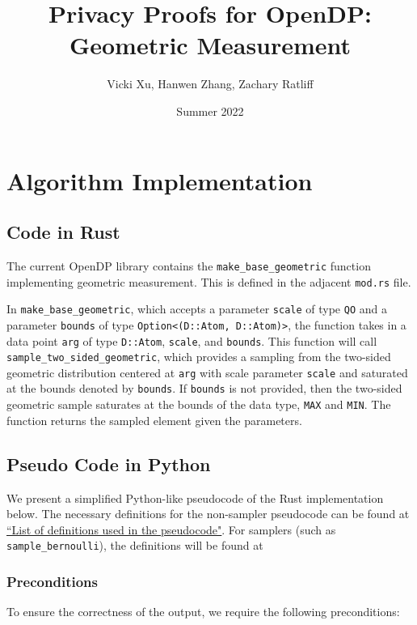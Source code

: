 \documentclass[11pt,a4paper]{article}
\title{Privacy Proofs for OpenDP: Geometric Measurement}
\author{Vicki Xu, Hanwen Zhang, Zachary Ratliff}
\date{Summer 2022}
\newcommand{\vicki}[1]{{ {\color{olive}{(vicki)~#1}}}}
\begin{document}
\maketitle
\tableofcontents

\section{Algorithm Implementation}
\subsection{Code in Rust}
The current OpenDP library contains the \texttt{make\_base\_geometric} function implementing geometric measurement. This is defined in the adjacent \texttt{mod.rs} file. 

In \texttt{make\_base\_geometric}, which accepts a parameter \texttt{scale} of type \texttt{QO} and a parameter \texttt{bounds} of type \texttt{Option<(D::Atom, D::Atom)>}, the function takes in a data point \texttt{arg} of type \texttt{D::Atom}, \texttt{scale}, and \texttt{bounds}. This function will call \texttt{sample\_two\_sided\_geometric}, which provides a sampling from the two-sided geometric distribution centered at \texttt{arg} with scale parameter \texttt{scale} and saturated at the bounds denoted by \texttt{bounds}. If \texttt{bounds} is not provided, then the two-sided geometric sample saturates at the bounds of the data type, \texttt{MAX} and \texttt{MIN}. The function returns the sampled element given the parameters. 

\subsection{Pseudo Code in Python}\label{sec:pseudocode}

We present a simplified Python-like pseudocode of the Rust implementation below. The necessary definitions for the non-sampler pseudocode can be found at \href{https://github.com/opendp/whitepapers/blob/pseudocode-defns/pseudocode-defns/pseudocode_defns.pdf}{``List of definitions used in the pseudocode"}. \vicki{fix link} For samplers (such as \texttt{sample\_bernoulli}), the definitions will be found at \vicki{insert link here}

\subsubsection*{Preconditions}
To ensure the correctness of the output, we require the following preconditions:
\end{document}
